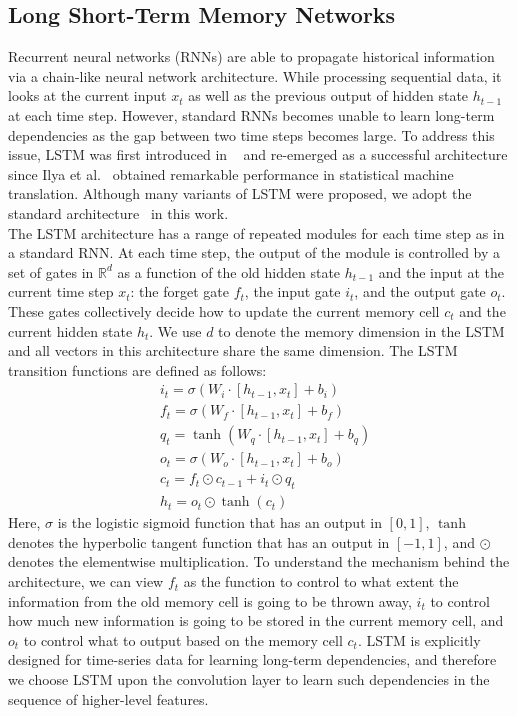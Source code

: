 \documentclass[11pt,letterpaper]{article}
\begin{document}
\subsection{Long Short-Term Memory Networks}
Recurrent neural networks (RNNs) are able to propagate historical
information via a chain-like neural network architecture. While
processing sequential data, it looks at the current input $x_t$ as well
as the previous output of hidden state $h_{t-1}$ at each time step.
However, standard RNNs becomes unable to learn long-term dependencies as
the gap between two time steps becomes large.
To address this issue, LSTM was first introduced in ~\cite{lstm} and
re-emerged as a successful architecture since Ilya et
al.~ obtained remarkable performance in statistical
machine translation. Although many variants of LSTM were proposed, we
adopt the standard architecture~\cite{lstm} in this work.\\
\indent The LSTM architecture has a range of repeated modules for each
time step as in a standard RNN. At each time step, the output of the
module is controlled by a set of gates in $\mathbb{R}^d$ as a function
of the old hidden state $h_{t-1}$ and the input at the current time step
$x_t$: the forget gate $f_t$, the input gate $i_t$, and the output gate
$o_t$. These gates collectively decide how to update the current memory
cell $c_t$ and the current hidden state $h_t$. We use $d$ to denote
the memory dimension in the LSTM and all vectors in this architecture
share the same dimension.
The LSTM transition functions are defined as follows:
\begin{align}
& i_t = \sigma(W_i \cdot [h_{t-1}, x_t] + b_i)
\\ \nonumber & f_t = \sigma(W_f \cdot [h_{t-1}, x_t] + b_f)
\\ \nonumber & q_t = \tanh(W_q \cdot [h_{t-1},x_t] + b_q)
\\ \nonumber & o_t = \sigma(W_o \cdot [h_{t-1}, x_t] + b_o)
\\ \nonumber & c_t = f_t \odot c_{t-1} + i_t \odot q_t
\\ \nonumber & h_t = o_t \odot \tanh(c_t)
\end{align}
Here, $\sigma$ is the logistic sigmoid function that has an output in
$[0,1]$, $\tanh$ denotes the hyperbolic tangent function that has an
output in $[-1, 1]$, and $\odot$ denotes the elementwise multiplication.
To understand the mechanism behind the architecture, we can view
$f_t$ as the function to control to
what extent the information from the old memory cell is going to be
thrown away, $i_t$ to control how much new information is going to be
stored in the current memory cell, and $o_t$ to control what to output
based on the memory cell $c_t$. LSTM is explicitly designed for
time-series data for learning long-term dependencies, and therefore we choose
LSTM upon the convolution layer to learn such dependencies in the
sequence of higher-level features.
\end{document}
